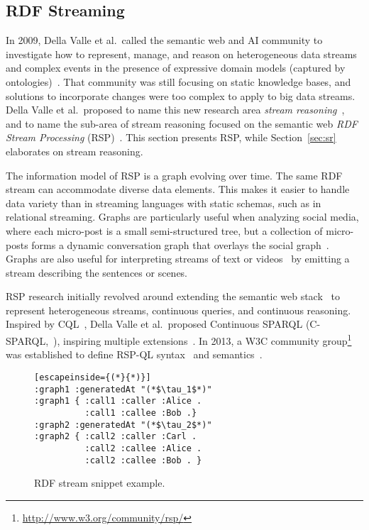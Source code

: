 \subsection{RDF Streaming}\label{sec:rdf} %

In 2009, Della Valle et al.\ called the semantic web and AI community
to investigate how to represent, manage, and reason on heterogeneous
data streams and complex events in the presence of expressive domain
models (captured by ontologies)~\cite{DBLP:journals/expert/ValleCHF09}.
That community was still focusing on static knowledge bases, and
solutions to incorporate changes were too complex to apply to big data
streams.  Della Valle et al.\ proposed to name this new research area
\emph{stream reasoning}~\cite{DellAglioDataScience2017}, and to name
the sub-area of stream reasoning focused on the semantic web \emph{RDF
  Stream Processing} (RSP)~\cite{DBLP:conf/debs/ValleDM16}. This
section presents RSP, while Section~\ref{sec:sr} elaborates on stream
reasoning.

The information model of RSP is a graph evolving over time. The same
RDF stream can accommodate diverse data elements. This makes it easier
to handle data variety than in streaming languages with static
schemas, such as in relational streaming.  Graphs are particularly
useful when analyzing social media, where each micro-post is a small
semi-structured tree, but a collection of micro-posts forms a dynamic
conversation graph that overlays the social
graph~\cite{DBLP:conf/semweb/BalduiniVDTPC13}. Graphs are also useful for
interpreting streams of text or
videos~\cite{DBLP:journals/semweb/GangemiPRNDM17} by emitting a stream
describing the sentences or scenes.

\sloppy RSP research initially revolved around extending the
semantic web stack~\cite{DBLP:books/daglib/0036180} to represent
heterogeneous streams, continuous queries, and continuous
reasoning. Inspired by CQL~\cite{arasu_widom_2004}, Della Valle et
al.\ proposed Continuous SPARQL
(C-SPARQL,~\cite{DBLP:conf/fis/ValleCBBC08}), inspiring multiple
extensions~\cite{DBLP:journals/semweb/AnicicRFS12,Calbimonte2010,LePhuoc2012c}.
In 2013, a W3C community
group\footnote{\url{http://www.w3.org/community/rsp/}} was established
to define \mbox{RSP-QL} syntax~\cite{DBLP:conf/esws/DellAglioCVC15}
and semantics~\cite{DBLP:journals/ijswis/DellAglioVCC14}.

\begin{figure}[!h]
\begin{lstlisting}[escapeinside={(*}{*)}]
:graph1 :generatedAt "(*$\tau_1$*)"
:graph1 { :call1 :caller :Alice .
          :call1 :callee :Bob .}
:graph2 :generatedAt "(*$\tau_2$*)" 
:graph2 { :call2 :caller :Carl .
          :call2 :callee :Alice .
          :call2 :callee :Bob . }  
\end{lstlisting}
\vspace*{-4mm}
\caption{\label{fig:rdfstream}RDF stream snippet example.}
\end{figure}

